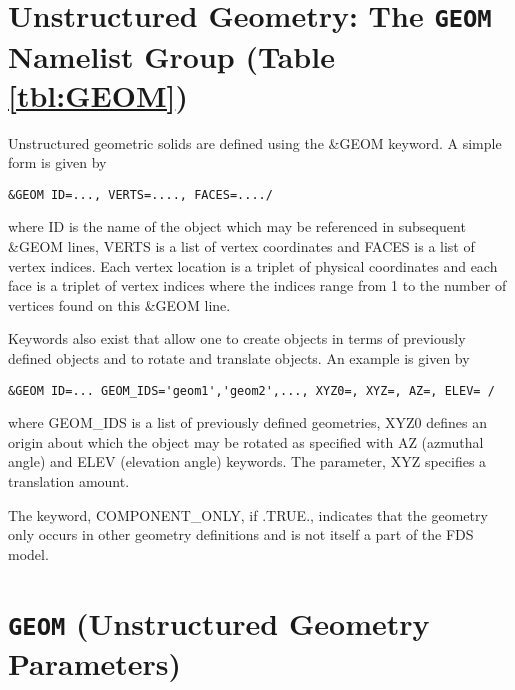 \documentclass[12pt]{article}
\begin{document}
\vspace{1.0in}
\section{Unstructured Geometry: The \texorpdfstring{{\tt GEOM}}{GEOM} Namelist Group (Table \ref{tbl:GEOM})}
\label{info:GEOM}

Unstructured geometric solids are defined using the \&GEOM keyword.
A simple form is given by

\begin{verbatim}
&GEOM ID=..., VERTS=...., FACES=..../
\end{verbatim}

where ID is the name of the object which may be referenced in subsequent \&GEOM lines, VERTS is a list of vertex coordinates and FACES is a list of vertex indices.  Each vertex location is a triplet of physical coordinates and each face is a triplet of vertex indices where the indices range from 1 to the number of vertices found on this \&GEOM line.

Keywords also exist that allow one to create objects in terms of previously defined objects and to rotate and translate objects.  An example is given by

\begin{verbatim}
&GEOM ID=... GEOM_IDS='geom1','geom2',..., XYZ0=, XYZ=, AZ=, ELEV= /
\end{verbatim}

where GEOM\_IDS is a list of previously defined geometries, XYZ0 defines an origin about which the object may be rotated as specified with AZ (azmuthal angle) and ELEV (elevation angle) keywords. The parameter, XYZ specifies a translation amount.

The keyword, COMPONENT\_ONLY, if .TRUE., indicates that the geometry only occurs in other geometry definitions and is not itself a part of the FDS model.


\vspace{\baselineskip}




\section{\texorpdfstring{{\tt GEOM}}{GEOM} (Unstructured Geometry Parameters)}
\end{document}
